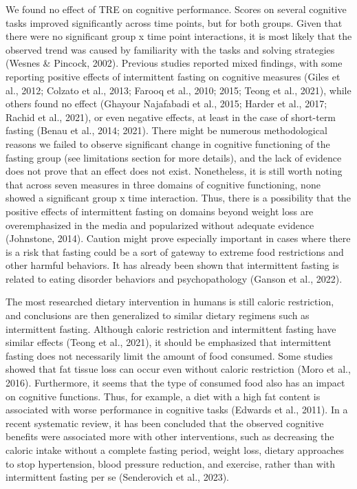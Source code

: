 \documentclass[authordate, empirical,issue]{jote-new-article}
\begin{document}
We found no effect of TRE on cognitive performance. Scores on several cognitive tasks improved significantly across time points, but for both groups. Given that there were no significant group x time point interactions, it is most likely that the observed trend was caused by familiarity with the tasks and solving strategies (Wesnes \& Pincock, 2002). Previous studies reported mixed findings, with some reporting positive effects of intermittent fasting on cognitive measures (Giles et al., 2012; Colzato et al., 2013; Farooq et al., 2010; 2015; Teong et al., 2021), while others found no effect (Ghayour Najafabadi et al., 2015; Harder et al., 2017; Rachid et al., 2021), or even negative effects, at least in the case of short-term fasting (Benau et al., 2014; 2021). There might be numerous methodological reasons we failed to observe significant change in cognitive functioning of the fasting group (see limitations section for more details), and the lack of evidence does not prove that an effect does not exist. Nonetheless, it is still worth noting that across seven measures in three domains of cognitive functioning, none showed a significant group x time interaction. Thus, there is a possibility that the positive effects of intermittent fasting on domains beyond weight loss are overemphasized in the media and popularized without adequate evidence (Johnstone, 2014). Caution might prove especially important in cases where there is a risk that fasting could be a sort of gateway to extreme food restrictions and other harmful behaviors. It has already been shown that intermittent fasting is related to eating disorder behaviors and psychopathology (Ganson et al., 2022).



The most researched dietary intervention in humans is still caloric restriction, and conclusions are then generalized to similar dietary regimens such as intermittent fasting. Although caloric restriction and intermittent fasting have similar effects (Teong et al., 2021), it should be emphasized that intermittent fasting does not necessarily limit the amount of food consumed. Some studies showed that fat tissue loss can occur even without caloric restriction (Moro et al., 2016). Furthermore, it seems that the type of consumed food also has an impact on cognitive functions. Thus, for example, a diet with a high fat content is associated with worse performance in cognitive tasks (Edwards et al., 2011). In a recent systematic review, it has been concluded that the observed cognitive benefits were associated more with other interventions, such as decreasing the caloric intake without a complete fasting period, weight loss, dietary approaches to stop hypertension, blood pressure reduction, and exercise, rather than with intermittent fasting per se (Senderovich et al., 2023).
\end{document}
